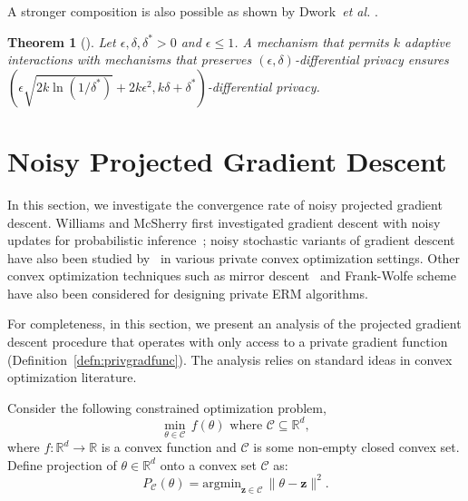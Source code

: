 \documentclass{article}
\theoremstyle{plain}
\newtheorem{theorem}{Theorem}[section]
\def \z {\mathbf z}
\def \CCC {\mathcal{C}}
\def \R {\mathbb{R}}
\begin{document}
A stronger composition is also possible as shown by Dwork~\emph{et al.} \cite{DRV10}.

\begin{theorem}[\cite{DRV10}]\label{thm:composition2}
Let $\epsilon,\delta,\delta^\ast>0$ and $\epsilon \leq 1$. A mechanism that permits $k$ adaptive interactions with mechanisms that preserves $(\epsilon,\delta)$-differential privacy %
ensures $(\epsilon\sqrt{2k\ln(1/\delta^\ast)}+ 2 k\epsilon^2, k\delta+\delta^\ast)$-differential privacy.
\end{theorem}




\section{Noisy Projected Gradient Descent} \label{app:noisyproj}
In this section, we investigate the convergence rate of noisy projected gradient descent. Williams and McSherry first investigated gradient descent with noisy updates for probabilistic inference~\cite{williams2010probabilistic}; noisy stochastic variants of gradient descent have also been studied by~\cite{DBLP:journals/jmlr/JainKT12,duchi2013local,song2013stochastic,bassily2014differentially} in various private convex optimization settings. Other convex optimization techniques such as mirror descent~\cite{duchi2014privacy,talwar2014private} and Frank-Wolfe scheme~\cite{talwar2014private} have also been considered for designing private ERM algorithms. 

For completeness, in this section, we present an analysis of the projected gradient descent procedure that operates with only access to a private gradient function (Definition~\ref{defn:privgradfunc}). The analysis relies on standard ideas in convex optimization literature.

Consider the following constrained optimization problem,
\begin{equation} \label{eqn:npg} \min_{\theta \in \CCC}\, f(\theta) \mbox{ where } \CCC \subseteq \R^d, \end{equation}
where $f: \R^d \rightarrow \R$ is a convex function and $\CCC$ is some non-empty closed convex set. Define projection of $\theta \in \R^d$ onto a convex set $\CCC$ as:
$$P_{\CCC}(\theta) = \mbox{argmin}_{\z \in \CCC}\, \| \theta - \z \|^2.$$
\end{document}
